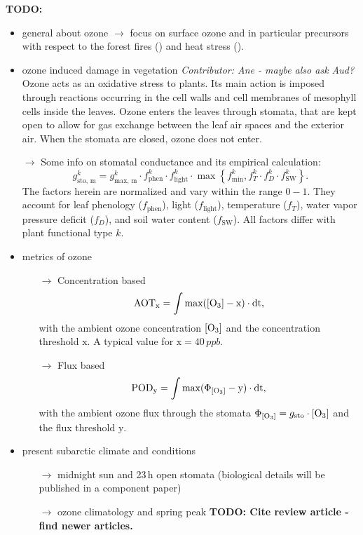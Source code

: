 \documentclass[bg, manuscript]{copernicus}
\begin{document}
{\bf TODO:
\begin{itemize}
\item general about ozone $\rightarrow$ focus on surface ozone and in particular precursors with respect to the forest fires () and heat stress ().
\item ozone induced damage in vegetation \emph{Contributor: Ane - maybe also ask Aud?}\\
  Ozone acts as an oxidative stress to plants. Its main action is imposed through reactions occurring in the cell walls and cell membranes of mesophyll cells inside the leaves. Ozone enters the leaves through stomata, that are kept open to allow for gas exchange between the leaf air spaces and the exterior air. When the stomata are closed, ozone does not enter.
\item[$\rightarrow$] Some info on stomatal conductance and its empirical calculation:
  \begin{equation}
  g^k_\text{sto, m} = g^k_\text{max, m} \cdot f^k_\text{phen} \cdot f^k_\text{light} \cdot \max{\left\{f^k_\text{min}, f^k_T \cdot f^k_D \cdot f^k_\text{SW}\right\}}.
  \label{eq:stomatal}
\end{equation}
%
The factors herein are normalized and vary within the range $0-1$. They account for leaf phenology ($f_\text{phen}$), light ($f_\text{light}$), temperature ($f_T$), water vapor pressure deficit ($f_D$), and soil water content ($f_\text{SW}$). All factors differ with plant functional type $k$.
\item metrics of ozone
  \begin{itemize}
  \item[$\rightarrow$] Concentration based
    \begin{equation}
      \mathrm{AOT_x} = \int{\mathrm{max(\chem{[O_3]}-x)}\cdot \mathrm{dt}},
    \end{equation}
    with the ambient ozone concentration $\chem{[O_3]}$ and the concentration threshold $\mathrm{x}$. A typical value for $\mathrm{x}=40\,\unit{ppb}$.
  \item[$\rightarrow$] Flux based
    \begin{equation}
      \mathrm{POD_y} = \int{\mathrm{max(\Phi_\chem{[O_3]}-y)}\cdot \mathrm{dt}},
    \end{equation}
    with the ambient ozone flux through the stomata $\Phi_\chem{[O_3]} = g_\mathrm{sto} \cdot \chem{[O_3]}$ and the flux threshold $\mathrm{y}$.
  \end{itemize}
\item present subarctic climate and conditions
  \begin{itemize}
  \item[$\rightarrow$] midnight sun and 23\,\unit{h} open stomata (biological details will be published in a component paper)
  \item[$\rightarrow$] ozone climatology and spring peak {\bf TODO: Cite review article - find newer articles.}
  \end{itemize}
\end{itemize}
}
\end{document}
